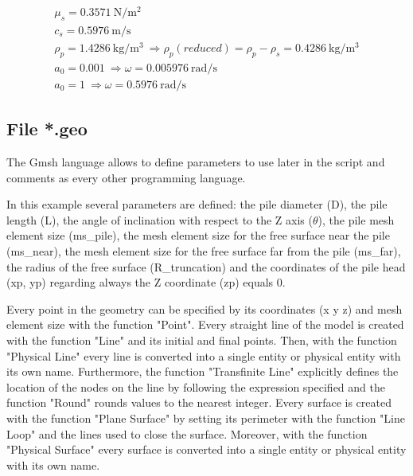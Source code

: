 \documentclass[a4]{article}
\begin{document}
\begin{equation}
	\begin{array}{l}
		\mu_s = 0.3571 \medspace \mathrm{N/m^2} \\
		c_s = 0.5976 \medspace \mathrm{m/s} \\
		\rho_p = 1.4286 \medspace \mathrm{kg/m^3} \medspace \Longrightarrow \rho_p (reduced) = \rho_p - \rho_s = 0.4286 \medspace \mathrm{kg/m^3}\\
		a_0 = 0.001 \medspace \Longrightarrow \omega = 0.005976 \medspace \mathrm{rad/s}\\
		a_0 = 1 \medspace \Longrightarrow \omega = 0.5976 \medspace \mathrm{rad/s}
	\end{array}
\end{equation}

\subsection{File *.geo}

The Gmsh language allows to define parameters to use later in the script and comments as every other programming language. 

In this example several parameters are defined: the pile diameter (D), the pile length (L), the angle of inclination with respect to the Z axis ($\theta$), the pile mesh element size (ms\_pile), the mesh element size for the free surface near the pile (ms\_near), the mesh element size for the free surface far from the pile (ms\_far), the radius of the free surface (R\_truncation) and the coordinates of the pile head (xp, yp) regarding always the Z coordinate (zp) equals 0. 

Every point in the geometry can be specified by its coordinates (x y z) and mesh element size with the function "Point". Every straight line of the model is created with the function "Line" and its initial and final points. Then, with the function "Physical Line" every line is converted into a single entity or physical entity with its own name. Furthermore, the function "Transfinite Line" explicitly defines the location of the nodes on the line by following the expression specified and the function "Round" rounds values to the nearest integer. Every surface is created with the function "Plane Surface" by setting its perimeter with the function "Line Loop" and the lines used to close the surface. Moreover, with the function "Physical Surface" every surface is converted into a single entity or physical entity with its own name.  
\end{document}
